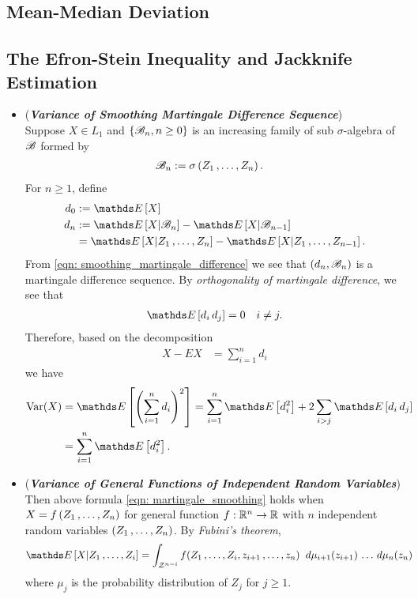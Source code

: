 \documentclass[11pt]{article}
\begin{document}
\subsection{Mean-Median Deviation}
\subsection{The Efron-Stein Inequality and Jackknife Estimation}
\begin{itemize}
\item \begin{remark} (\textbf{\emph{Variance of Smoothing Martingale Difference Sequence}})\\
Suppose $X \in L_1$ and $\left\{{\mathscr B}_n, n \ge 0\right\}$ is an increasing family of sub $\sigma$-algebra of ${\mathscr B}$ formed by 
\begin{align*}
{\mathscr B}_n &:= \sigma\left(Z_1 \,{,}\ldots{,}\, Z_n\right).
\end{align*} For $n \ge 1$, define 
\begin{align*}
d_0 &:= \E{}{X} \\ 
d_n &:= \E{}{X | \srB_n} - \E{}{X | \srB_{n-1}} \\
&= \E{}{X | Z_1 \xdotx{,} Z_n} -  \E{}{X | Z_1 \xdotx{,} Z_{n-1}}.
\end{align*} From \eqref{eqn: smoothing_martingale_difference} we see that $(d_n, {\mathscr B}_n)$ is a martingale difference sequence. By \emph{orthogonality of martingale difference}, we see that 
\begin{align*}
\E{}{d_i\, d_j} =0 \quad i\neq j.
\end{align*} Therefore, based on the decomposition
\begin{align*}
X - E{}{X} &= \sum_{i=1}^{n}d_i
\end{align*}
we have 
\begin{align}
\text{Var}(X) &= \E{}{\paren{\sum_{i=1}^{n}d_i}^2} = \sum_{i=1}^{n}\E{}{d_i^2} + 2 \sum_{i > j}\E{}{d_i\,d_j}\nonumber\\
&=  \sum_{i=1}^{n}\E{}{d_i^2}. \label{eqn: martingale_smoothing}
\end{align}
\end{remark}

\item \begin{remark}(\textbf{\emph{Variance of General Functions of Independent Random Variables}})\\
Then above formula \eqref{eqn: martingale_smoothing} holds when $X = f\left(Z_1 \,{,}\ldots{,}\, Z_n\right)$ for general function $f: {\mathbb R}^n \to {\mathbb R}$ with $n$ independent random variables $(Z_1 \,{,}\ldots{,}\, Z_n)$. By \emph{Fubini's theorem},
\begin{align*}
 \E{}{X | Z_1 \xdotx{,} Z_i} &= \int_{\cZ^{n-i}} f(Z_1 \xdotx{,} Z_i, z_{i+1} \xdotx{,} z_n) \;\;d\mu_{i+1}(z_{i+1})  \xdotx{} d\mu_{n}(z_{n})
\end{align*} where $\mu_j$ is the probability distribution of $Z_j$ for $j \ge 1$. 


\end{remark}
\end{itemize}
\end{document}
